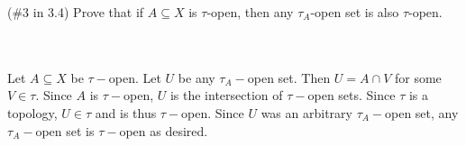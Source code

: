 (\#3 in 3.4) Prove that if $A\subseteq X$ is $\tau$-open, then any $\tau_{A}$-open set is also
$\tau$-open.\\\\

\begin{solution}\renewcommand{\qedsymbol}{}\ \\
    Let $A\subseteq X$ be $\tau-$open. Let $U$ be any $\tau_{A}-$open set. Then $U=A\cap V$ for some
    $V\in\tau$. Since $A$ is $\tau-$open, $U$ is the intersection of $\tau-$open sets. Since $\tau$ is a
    topology, $U\in\tau$ and is thus $\tau-$open. Since $U$ was an arbitrary $\tau_{A}-$open set, any
    $\tau_{A}-$open set is $\tau-$open as desired.

\end{solution}
